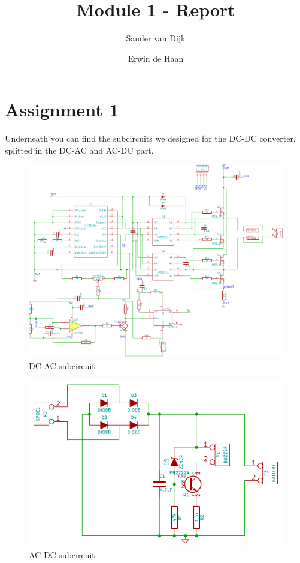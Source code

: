 \documentclass[final]{scrreprt} %
\title{Module 1 - Report}
\author{Sander {van Dijk} \and Erwin {de Haan}}
\begin{document}
\chapter{Assignment 1}
Underneath you can find the subcircuits we designed for the DC-DC converter, splitted in the DC-AC and AC-DC part.

\begin{figure}[h]
	\includegraphics[width=\linewidth]{resources/DC-AC-rc.pdf}
	\caption{DC-AC subcircuit}
	\label{fig:DC-AC}
\end{figure}

\begin{figure}[h]
	\includegraphics[width=\linewidth]{resources/AC-DC-rc.pdf}
	\caption{AC-DC subcircuit}
	\label{fig:AC-DC}
\end{figure}
\end{document}
